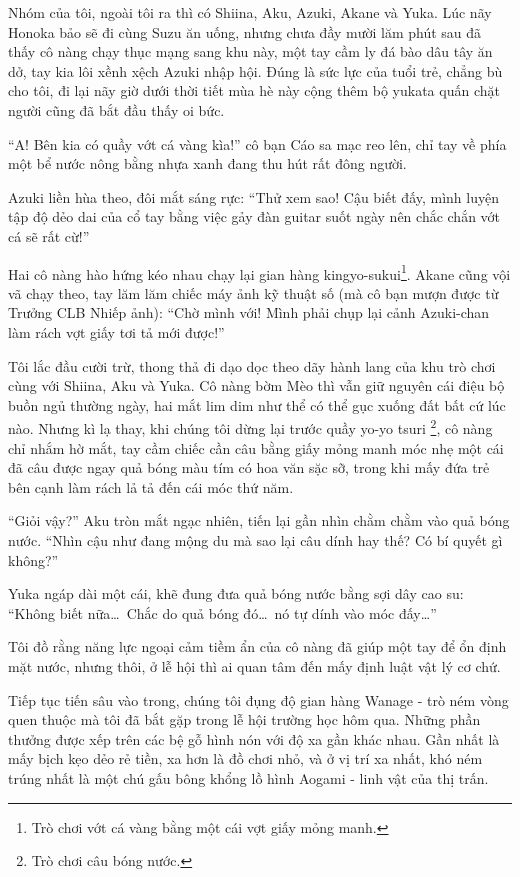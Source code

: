 \documentclass[../main.tex]{subfiles}
\begin{document}
Nhóm của tôi, ngoài tôi ra thì có Shiina, Aku, Azuki, Akane và Yuka. Lúc nãy Honoka bảo sẽ đi cùng Suzu ăn uống, nhưng chưa đầy mười lăm phút sau đã thấy cô nàng chạy thục mạng sang khu này, một tay cầm ly đá bào dâu tây ăn dở, tay kia lôi xềnh xệch Azuki nhập hội. Đúng là sức lực của tuổi trẻ, chẳng bù cho tôi, đi lại nãy giờ dưới thời tiết mùa hè này cộng thêm bộ yukata quấn chặt người cũng đã bắt đầu thấy oi bức.

``A! Bên kia có quầy vớt cá vàng kìa!'' cô bạn Cáo sa mạc reo lên, chỉ tay về phía một bể nước nông bằng nhựa xanh đang thu hút rất đông người.

Azuki liền hùa theo, đôi mắt sáng rực: ``Thử xem sao! Cậu biết đấy, mình luyện tập độ dẻo dai của cổ tay bằng việc gảy đàn guitar suốt ngày nên chắc chắn vớt cá sẽ rất cừ!''

Hai cô nàng hào hứng kéo nhau chạy lại gian hàng kingyo-sukui\footnote{Trò chơi vớt cá vàng bằng một cái vợt giấy mỏng manh.}. Akane cũng vội vã chạy theo, tay lăm lăm chiếc máy ảnh kỹ thuật số (mà cô bạn mượn được từ Trưởng CLB Nhiếp ảnh): ``Chờ mình với! Mình phải chụp lại cảnh Azuki-chan làm rách vợt giấy tơi tả mới được!''

Tôi lắc đầu cười trừ, thong thả đi dạo dọc theo dãy hành lang của khu trò chơi cùng với Shiina, Aku và Yuka. Cô nàng bờm Mèo thì vẫn giữ nguyên cái điệu bộ buồn ngủ thường ngày, hai mắt lim dim như thể có thể gục xuống đất bất cứ lúc nào. Nhưng kì lạ thay, khi chúng tôi dừng lại trước quầy yo-yo tsuri \footnote{Trò chơi câu bóng nước.}, cô nàng chỉ nhắm hờ mắt, tay cầm chiếc cần câu bằng giấy mỏng manh móc nhẹ một cái đã câu được ngay quả bóng màu tím có hoa văn sặc sỡ, trong khi mấy đứa trẻ bên cạnh làm rách lả tả đến cái móc thứ năm.

``Giỏi vậy?'' Aku tròn mắt ngạc nhiên, tiến lại gần nhìn chằm chằm vào quả bóng nước. ``Nhìn cậu như đang mộng du mà sao lại câu dính hay thế? Có bí quyết gì không?''

Yuka ngáp dài một cái, khẽ đung đưa quả bóng nước bằng sợi dây cao su: ``Không biết nữa\dots\ Chắc do quả bóng đó\dots\ nó tự dính vào móc đấy\dots''

Tôi đồ rằng năng lực ngoại cảm tiềm ẩn của cô nàng đã giúp một tay để ổn định mặt nước, nhưng thôi, ở lễ hội thì ai quan tâm đến mấy định luật vật lý cơ chứ.

Tiếp tục tiến sâu vào trong, chúng tôi đụng độ gian hàng Wanage - trò ném vòng quen thuộc mà tôi đã bắt gặp trong lễ hội trường học hôm qua. Những phần thưởng được xếp trên các bệ gỗ hình nón với độ xa gần khác nhau. Gần nhất là mấy bịch kẹo dẻo rẻ tiền, xa hơn là đồ chơi nhỏ, và ở vị trí xa nhất, khó ném trúng nhất là một chú gấu bông khổng lồ hình Aogami - linh vật của thị trấn.
\end{document}

